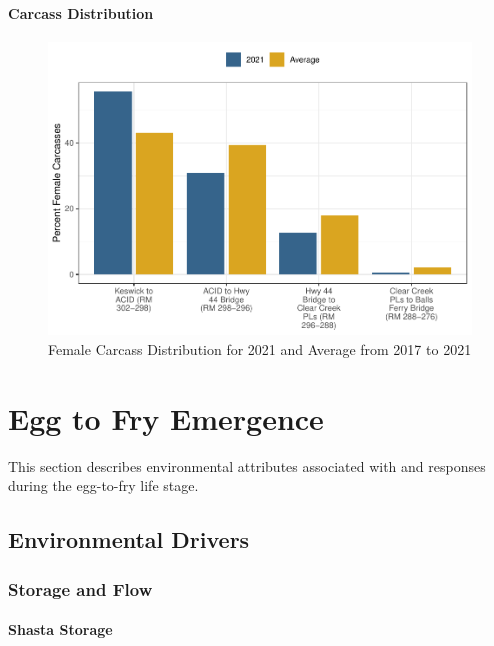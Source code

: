 \documentclass[
]{book}
\theoremstyle{definition}
\theoremstyle{definition}
\theoremstyle{definition}
\theoremstyle{definition}
\theoremstyle{remark}
\begin{document}
\hypertarget{carcass-distribution}{%
\subsubsection{Carcass Distribution}\label{carcass-distribution}}

\begin{figure}
\centering
\includegraphics{_main_files/figure-latex/carcassdistrib-fig-1.pdf}
\caption{\label{fig:carcassdistrib-fig}Female Carcass Distribution for 2021 and Average from 2017 to 2021}
\end{figure}

\hypertarget{egg-to-fry-emergence}{%
\chapter{Egg to Fry Emergence}\label{egg-to-fry-emergence}}

This section describes environmental attributes associated with and responses during the egg-to-fry life stage.

\hypertarget{environmental-drivers}{%
\section{Environmental Drivers}\label{environmental-drivers}}

\hypertarget{storage-and-flow-1}{%
\subsection{Storage and Flow}\label{storage-and-flow-1}}

\hypertarget{shasta-storage-1}{%
\subsubsection{Shasta Storage}\label{shasta-storage-1}}
\end{document}
